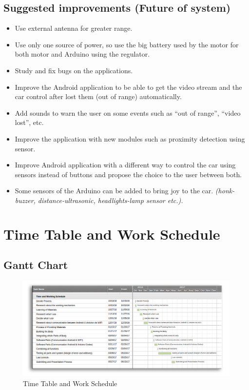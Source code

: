 \documentclass[11pt]{article}
\begin{document}
\vspace{0.4cm}

\subsection{Suggested improvements (Future of system)}
\begin{itemize}
\item Use external antenna for greater range.
\item Use only one source of power, so use the big battery used by the motor for both motor and Arduino using the regulator.
\item Study and fix bugs on the applications.
\item Improve the Android application to be able to get the video stream and the car control after lost them (out of range) automatically.
\item Add sounds to warn the user on some events such as “out of range”, “video lost”, etc.
\item Improve the application with new modules such as proximity detection using sensor.
\item Improve Android application with a different way to control the car using sensors instead of buttons and propose the choice to the user between both.
\item Some sensors of the Arduino can be added to bring joy to the car. \textit{(honk-buzzer, distance-ultrasonic, headlights-lamp sensor etc.).}
\end{itemize}

\pagebreak



\section{Time Table and Work Schedule}
\subsection{Gantt Chart}
\begin{figure}[h]
\centering
\includegraphics[scale=0.45]{ganttChart.png}
\caption{Time Table and Work Schedule}
\end{figure}
\end{document}
